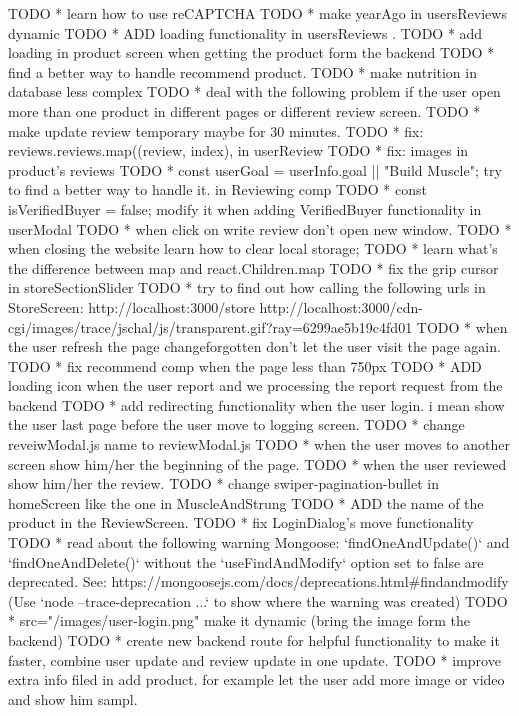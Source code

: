 TODO * learn how to use reCAPTCHA
TODO * make yearAgo in usersReviews dynamic 
TODO * ADD loading functionality in usersReviews .
TODO * add loading in product screen when getting the product form the backend
TODO * find a better way to handle recommend product.
TODO * make nutrition in database less complex
TODO * deal with the following problem if the user open more than one product in different pages or different review screen.
TODO * make update review temporary maybe for 30 minutes.
TODO * fix: reviews.reviews.map((review, index), in userReview
TODO * fix: images in product's reviews 
TODO * const userGoal = userInfo.goal || "Build Muscle"; try to find a better way to handle it. in Reviewing comp
TODO * const isVerifiedBuyer = false; modify it when adding VerifiedBuyer functionality in userModal
TODO * when click on write review don't open new window.
TODO * when closing the website learn how to clear local storage;
TODO * learn what's the difference between map and react.Children.map
TODO * fix the grip cursor in storeSectionSlider
TODO * try to find out how calling the following urls in StoreScreen:
         http://localhost:3000/store 
         http://localhost:3000/cdn-cgi/images/trace/jschal/js/transparent.gif?ray=6299ae5b19c4fd01 
TODO *  when the user refresh the page changeforgotten don't let the user visit the page again. 
TODO * fix recommend comp when the page less than 750px
TODO * ADD loading icon when the user report and we processing the report request from the backend
TODO * add redirecting functionality when the user login. i mean show the user last page before the user move to logging screen.
TODO * change reveiwModal.js name to reviewModal.js
TODO * when the user moves to another screen show him/her the beginning of the page.
TODO * when the user reviewed show him/her the review.
TODO * change swiper-pagination-bullet in homeScreen like the one in MuscleAndStrung
TODO * ADD the name of the product in the ReviewScreen.
TODO * fix  LoginDialog's move functionality 
TODO * read about the following warning 
       Mongoose: `findOneAndUpdate()` and `findOneAndDelete()` without the `useFindAndModify` option set to false are deprecated. See: https://mongoosejs.com/docs/deprecations.html#findandmodify
      (Use `node --trace-deprecation ...` to show where the warning was created)
TODO *   src="/images/user-login.png" make it dynamic (bring the image form the backend)
TODO * create new backend route for helpful functionality to make it faster, combine user update and review update in one update.
TODO * improve extra info filed in add product. for example let the user add more image or video and show him sampl.
